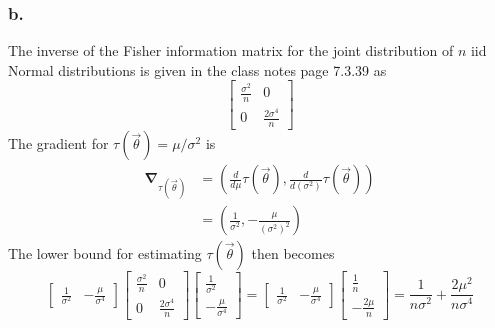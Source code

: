 \documentclass{article}
\begin{document}
\subsubsection*{b.}
The inverse of the Fisher information matrix for the joint distribution of $n$ iid Normal distributions is given in the class notes page 7.3.39 as 
\[\begin{bmatrix}
\frac{\sigma^2}{n} & 0 \\ 0 & \frac{2\sigma^4}{n}
\end{bmatrix}\]
The gradient for $\tau(\vec{\theta}) = \mu/\sigma^2$ is 
\begin{align*}
\mathbf{\nabla}_{\tau(\vec{\theta})} &= \left(\frac{d}{d\mu}\tau(\vec{\theta}), \frac{d}{d(\sigma^2)}\tau(\vec{\theta})\right) \\
&=\left(\frac{1}{\sigma^2}, -\frac{\mu}{\left(\sigma^2\right)^2}\right)
\end{align*}
The lower bound for estimating $\tau(\vec{\theta})$ then becomes
\[
\begin{bmatrix} \frac{1}{\sigma^2} & -\frac{\mu}{\sigma^4} \end{bmatrix}
\begin{bmatrix}\frac{\sigma^2}{n} & 0 \\ 0 & \frac{2\sigma^4}{n}\end{bmatrix}
\begin{bmatrix} \frac{1}{\sigma^2} \\ -\frac{\mu}{\sigma^4} \end{bmatrix}
= \begin{bmatrix} \frac{1}{\sigma^2} & -\frac{\mu}{\sigma^4} \end{bmatrix}
\begin{bmatrix} \frac{1}{n} \\ -\frac{2\mu}{n} \end{bmatrix}
=\frac{1}{n\sigma^2}+\frac{2\mu^2}{n\sigma^4}
\]
\end{document}
